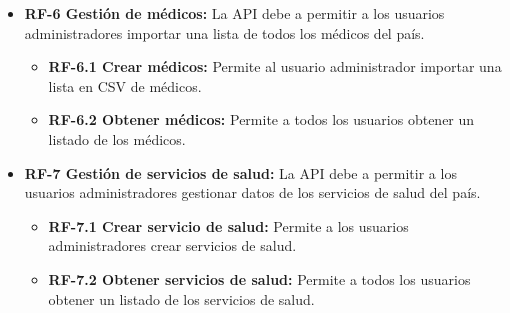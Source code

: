 \begin{itemize}
\tightlist
\item
  \textbf{RF-6 Gestión de médicos:} La API debe a permitir a los usuarios administradores importar una lista de todos los médicos del país. \\
  \begin{itemize}
  \tightlist
  \item
    \textbf{RF-6.1 Crear médicos:} Permite al usuario administrador importar una lista en CSV de médicos. \\
  \item
    \textbf{RF-6.2 Obtener médicos:} Permite a todos los usuarios obtener un listado de los médicos.\\
\end{itemize}    
\end{itemize}


\begin{itemize}
\tightlist
\item
  \textbf{RF-7 Gestión de servicios de salud:} La API debe a permitir a los usuarios administradores gestionar datos de los servicios de salud del país. \\
  \begin{itemize}
  \tightlist
  \item
    \textbf{RF-7.1 Crear servicio de salud:} Permite a los usuarios administradores crear servicios de salud.\\
  \item
    \textbf{RF-7.2 Obtener servicios de salud:} Permite a todos los usuarios obtener un listado de los servicios de salud.\\
\end{itemize}    
\end{itemize}

